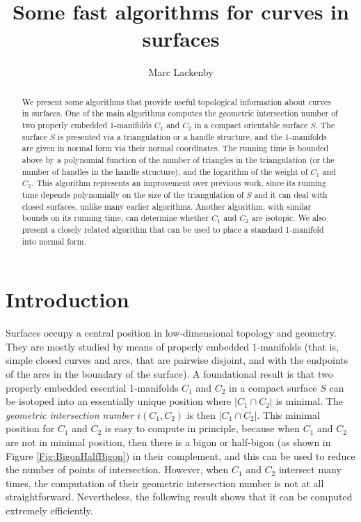 \documentclass[oneside]{amsart}
\title{Some fast algorithms for curves in surfaces}
\author{Marc Lackenby}
\numberwithin{equation}{section}
\theoremstyle{plain}
\theoremstyle{definition}
\begin{document}
\begin{abstract} 
We present some algorithms that provide useful topological information about curves in surfaces. One of the main algorithms
computes the geometric intersection number of two properly embedded 1-manifolds $C_1$ and $C_2$ in a compact orientable surface $S$. The surface $S$ is presented via a triangulation or a handle structure,
and the 1-manifolds are given in normal form via their normal coordinates. The running time is bounded above by a polynomial function
of the number of triangles in the triangulation (or the number of handles in the handle structure), and the logarithm of the weight of $C_1$ and $C_2$.
This algorithm represents an improvement over previous work, since its running time depends polynomially on the size of the triangulation of $S$ and it can 
deal with closed surfaces, unlike many earlier algorithms. Another algorithm, with similar bounds on its running time, can determine whether $C_1$ and $C_2$ are isotopic.
We also present a closely related algorithm that can be used to place a standard 1-manifold into normal form.
\end{abstract}
\maketitle

\section{Introduction}
\label{Sec:Intro}
Surfaces occupy a central position in low-dimensional topology and geometry. They are mostly studied by means of properly embedded 1-manifolds (that is, simple closed curves and arcs, that are pairwise disjoint, and with the endpoints of the arcs in the boundary of the surface). A foundational result is that two properly embedded essential 1-manifolds $C_1$ and $C_2$ in a compact surface $S$ can be isotoped into an essentially unique position where $|C_1 \cap C_2|$ is minimal. The \emph{geometric intersection number} $i(C_1, C_2)$ is then $|C_1 \cap C_2|$. This minimal position for $C_1$ and $C_2$ is easy to compute in principle, because when $C_1$ and $C_2$ are not in minimal position, then there is a bigon or half-bigon (as shown in Figure \ref{Fig:BigonHalfBigon}) in their complement, and this can be used to reduce the number of points of intersection. However, when $C_1$ and $C_2$ intersect many times, the computation of their geometric intersection number is not at all straightforward. Nevertheless, the following result shows that it can be computed extremely efficiently.
\end{document}
